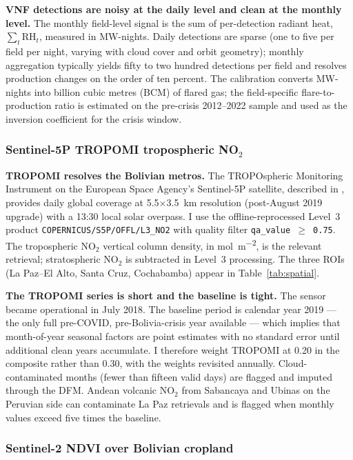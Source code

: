 \documentclass[11pt,letterpaper]{article}
\newcommand{\claim}[1]{\textbf{#1.}}
\begin{document}
\claim{VNF detections are noisy at the daily level and clean at the monthly level} The monthly field-level signal is the sum of per-detection radiant heat, $\textstyle \sum_t \text{RH}_t$, measured in MW-nights. Daily detections are sparse (one to five per field per night, varying with cloud cover and orbit geometry); monthly aggregation typically yields fifty to two hundred detections per field and resolves production changes on the order of ten percent. The \citet{elvidge_energies2016} calibration converts MW-nights into billion cubic metres (BCM) of flared gas; the field-specific flare-to-production ratio is estimated on the pre-crisis \numrange{2012}{2022} sample and used as the inversion coefficient for the crisis window.

\subsubsection{Sentinel-5P TROPOMI tropospheric NO$_2$}

\claim{TROPOMI resolves the Bolivian metros} The TROPOspheric Monitoring Instrument on the European Space Agency's Sentinel-5P satellite, described in \citet{veefkind2012}, provides daily global coverage at \num{5.5}$\times$\num{3.5}~km resolution (post-August \num{2019} upgrade) with a \num{13}:\num{30} local solar overpass. I use the offline-reprocessed Level~3 product \texttt{COPERNICUS/S5P/OFFL/L3\_NO2} with quality filter \texttt{qa\_value $\geq$ 0.75}. The tropospheric NO$_2$ vertical column density, in \unit{mol\per m\squared}, is the relevant retrieval; stratospheric NO$_2$ is subtracted in Level~3 processing. The three ROIs (La Paz--El Alto, Santa Cruz, Cochabamba) appear in Table~\ref{tab:spatial}.

\claim{The TROPOMI series is short and the baseline is tight} The sensor became operational in July \num{2018}. The baseline period is calendar year \num{2019} --- the only full pre-COVID, pre-Bolivia-crisis year available --- which implies that month-of-year seasonal factors are point estimates with no standard error until additional clean years accumulate. I therefore weight TROPOMI at \num{0.20} in the composite rather than \num{0.30}, with the weights revisited annually. Cloud-contaminated months (fewer than fifteen valid days) are flagged and imputed through the DFM. Andean volcanic NO$_2$ from Sabancaya and Ubinas on the Peruvian side can contaminate La Paz retrievals and is flagged when monthly values exceed five times the baseline.

\subsubsection{Sentinel-2 NDVI over Bolivian cropland}
\end{document}
